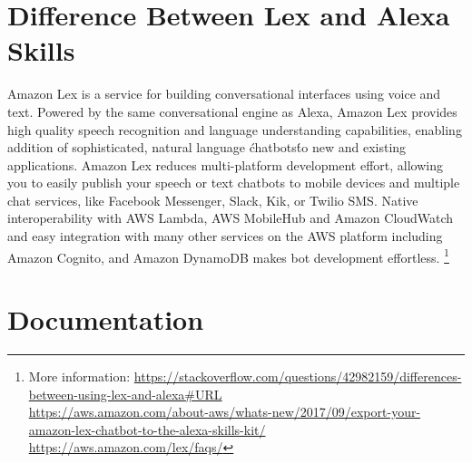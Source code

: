 
\section*{Difference Between Lex and Alexa Skills}
\label{lexAlexa}  

Amazon Lex is a service for building conversational interfaces using voice and text. Powered by the same conversational engine as Alexa, Amazon Lex provides high quality speech recognition and language understanding capabilities, enabling addition of sophisticated, natural language \'chatbots\' to new and existing applications. Amazon Lex reduces multi-platform development effort, allowing you to easily publish your speech or text chatbots to mobile devices and multiple chat services, like Facebook Messenger, Slack, Kik, or Twilio SMS. Native interoperability with AWS Lambda, AWS MobileHub and Amazon CloudWatch and easy integration with many other services on the AWS platform including Amazon Cognito, and Amazon DynamoDB makes bot development effortless. \footnote{
More information: \url{https://stackoverflow.com/questions/42982159/differences-between-using-lex-and-alexa\#URL}\\
\url{https://aws.amazon.com/about-aws/whats-new/2017/09/export-your-amazon-lex-chatbot-to-the-alexa-skills-kit/}\\
\url{https://aws.amazon.com/lex/faqs/}
}










\section*{Documentation}

%


